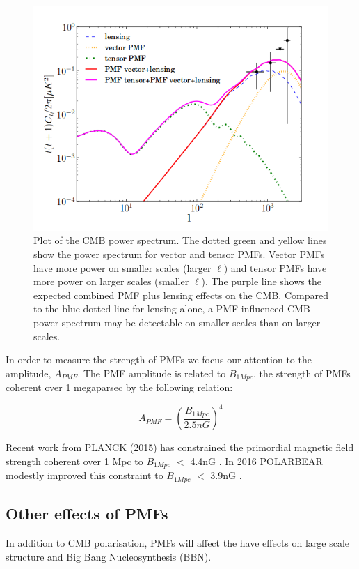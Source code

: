 \begin{figure}[h]
\centering
\includegraphics[scale=0.7]{images/PMFpower.png} 
\caption{Plot of the CMB power spectrum. The dotted green and yellow lines show the power spectrum for vector and tensor PMFs. Vector PMFs have more power on smaller scales (larger $\ell$) and tensor PMFs have more power on larger scales (smaller $\ell$). The purple line shows the expected combined PMF plus lensing effects on the CMB. Compared to the blue dotted line for lensing alone, a PMF-influenced CMB power spectrum may be detectable on smaller scales than on larger scales.}
\end{figure}

In order to measure the strength of PMFs we focus our attention to the amplitude, $A_{PMF}$. The PMF amplitude is related to $B_{1Mpc}$, the strength of PMFs coherent over 1 megaparsec by the following relation:

\begin{equation}
\label{eqn:ab}
A_{PMF} = (\frac{B_{1Mpc}}{2.5nG})^4
\end{equation}

Recent work from PLANCK (2015) has constrained the primordial magnetic field strength coherent over 1 Mpc to $B_{1Mpc}$ $<$ 4.4nG \cite{Ade:2015cva}. In 2016 POLARBEAR modestly improved this constraint to $B_{1Mpc}$ $<$ 3.9nG \cite{Ade:2015cao}.
\subsection{Other effects of PMFs}

In addition to CMB polarisation, PMFs will affect the have effects on large scale structure and Big Bang Nucleosynthesis (BBN).


